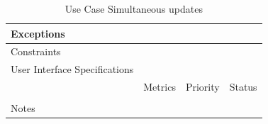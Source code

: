 \begin{table}[H]
\begin{tabularx}{\linewidth}{|l|X|X|X|}
            \hline Exceptions                    & \multicolumn{3}{l|}{}                                                                                 \\

            \hline Constraints                   & \multicolumn{3}{l|}{}                                                                                 \\

            \hline User Interface Specifications & \multicolumn{3}{l|}{}                                                                                 \\

            \hline \multirow{2}{*}{}             & Metrics                                                                           & Priority & Status \\
            \cline{2-4}                          &                                                                                   &          &        \\
            \hline Notes                         & \multicolumn{3}{l|}{}                                                                                 \\
            \hline
      \end{tabularx}
      \caption{Use Case Simultaneous updates}
      \label{tab:use_case_simultaneous_updates}
\end{table}

